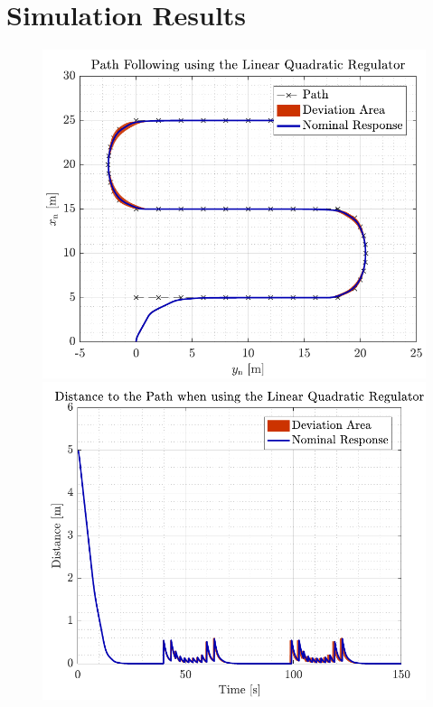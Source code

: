\section{Simulation Results}
\begin{figure}[H]
    \captionbox 
    {   
        \label{fig:path_lqr}
    }                                                                 
    {                                                                  
        \includegraphics[width=.45\textwidth]{figures/path_lqr}         
    }                                                                    
    \hspace{5pt}                                                          
    \captionbox  
    {      
        \label{fig:dist_lqr}
    }                                                                          
    {
        \includegraphics[width=.45\textwidth]{figures/dist_lqr}
    }
\end{figure}

